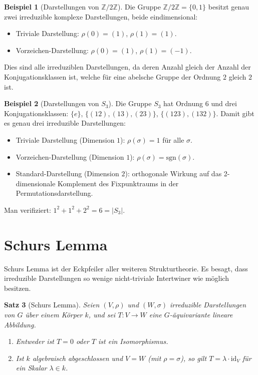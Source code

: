 \documentclass[12pt,a4paper]{amsart}
\newtheorem{theorem}{Satz}[section]
\theoremstyle{definition}
\newtheorem{beispiel}[theorem]{Beispiel}
\begin{document}
\begin{beispiel}[Darstellungen von $\mathbb{Z}/2\mathbb{Z}$]
Die Gruppe $\mathbb{Z}/2\mathbb{Z} = \{0,1\}$ besitzt genau zwei irreduzible
komplexe Darstellungen, beide eindimensional:
\begin{itemize}
  \item Triviale Darstellung: $\rho(0) = (1)$, $\rho(1) = (1)$.
  \item Vorzeichen-Darstellung: $\rho(0) = (1)$, $\rho(1) = (-1)$.
\end{itemize}
Dies sind alle irreduziblen Darstellungen, da deren Anzahl gleich der Anzahl der
Konjugationsklassen ist, welche für eine abelsche Gruppe der Ordnung $2$ gleich
$2$ ist.
\end{beispiel}

\begin{beispiel}[Darstellungen von $S_3$]
Die Gruppe $S_3$ hat Ordnung $6$ und drei Konjugationsklassen: $\{e\}$,
$\{(12),(13),(23)\}$, $\{(123),(132)\}$.  Damit gibt es genau drei irreduzible
Darstellungen:
\begin{itemize}
  \item Triviale Darstellung (Dimension $1$): $\rho(\sigma) = 1$ für alle $\sigma$.
  \item Vorzeichen-Darstellung (Dimension $1$): $\rho(\sigma) = \mathrm{sgn}(\sigma)$.
  \item Standard-Darstellung (Dimension $2$): orthogonale Wirkung auf das
        2-dimensionale Komplement des Fixpunktraums in der Permutationsdarstellung.
\end{itemize}
Man verifiziert: $1^2 + 1^2 + 2^2 = 6 = |S_3|$.
\end{beispiel}

\section{Schurs Lemma}
\label{sec:schur}

Schurs Lemma ist der Eckpfeiler aller weiteren Strukturtheorie.  Es besagt, dass
irreduzible Darstellungen so wenige nicht-triviale Intertwiner wie möglich besitzen.

\begin{theorem}[Schurs Lemma]
\label{satz:schur}
Seien $(V,\rho)$ und $(W,\sigma)$ irreduzible Darstellungen von $G$ über einem
Körper $k$, und sei $T \colon V \to W$ eine $G$-äquivariante lineare Abbildung.
\begin{enumerate}[label=\textup{(\roman*)}]
  \item Entweder ist $T = 0$ oder $T$ ist ein Isomorphismus.
  \item Ist $k$ algebraisch abgeschlossen und $V = W$ (mit $\rho = \sigma$), so
        gilt $T = \lambda \cdot \mathrm{id}_V$ für ein Skalar $\lambda \in k$.
\end{enumerate}
\end{theorem}
\end{document}
